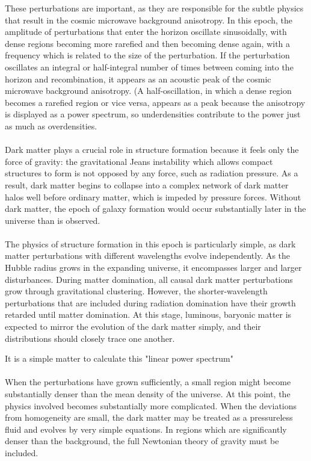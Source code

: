 \begin{description}
These perturbations are important, as they are responsible for the subtle physics that result in the cosmic microwave background anisotropy. In this epoch, the amplitude of perturbations that enter the horizon oscillate sinusoidally, with dense regions becoming more rarefied and then becoming dense again, with a frequency which is related to the size of the perturbation. If the perturbation oscillates an integral or half-integral number of times between coming into the horizon and recombination, it appears as an acoustic peak of the cosmic microwave background anisotropy. (A half-oscillation, in which a dense region becomes a rarefied region or vice versa, appears as a peak because the anisotropy is displayed as a power spectrum, so underdensities contribute to the power just as much as overdensities.
\\
\\
Dark matter plays a crucial role in structure formation because it feels only the force of gravity: the gravitational Jeans instability which allows compact structures to form is not opposed by any force, such as radiation pressure. As a result, dark matter begins to collapse into a complex network of dark matter halos well before ordinary matter, which is impeded by pressure forces. Without dark matter, the epoch of galaxy formation would occur substantially later in the universe than is observed.
\\
\\
The physics of structure formation in this epoch is particularly simple, as dark matter perturbations with different wavelengths evolve independently. As the Hubble radius grows in the expanding universe, it encompasses larger and larger disturbances. During matter domination, all causal dark matter perturbations grow through gravitational clustering. However, the shorter-wavelength perturbations that are included during radiation domination have their growth retarded until matter domination. At this stage, luminous, baryonic matter is expected to mirror the evolution of the dark matter simply, and their distributions should closely trace one another.

It is a simple matter to calculate this "linear power spectrum"\\
\\
When the perturbations have grown sufficiently, a small region might become substantially denser than the mean density of the universe. At this point, the physics involved becomes substantially more complicated. When the deviations from homogeneity are small, the dark matter may be treated as a pressureless fluid and evolves by very simple equations. In regions which are significantly denser than the background, the full Newtonian theory of gravity must be included.\\
\\

\end{description}

